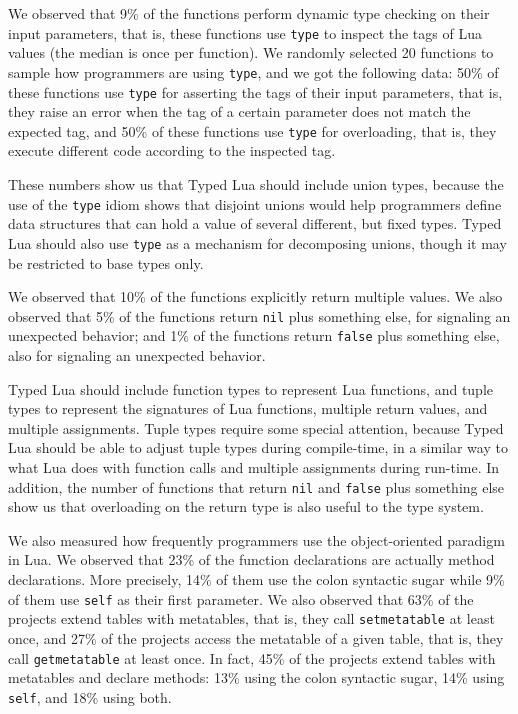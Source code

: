 We observed that 9\% of the functions perform dynamic type checking
on their input parameters, that is, these functions use \texttt{type}
to inspect the tags of Lua values (the median is once per function).
We randomly selected 20 functions to sample how programmers are
using \texttt{type}, and we got the following data:
50\% of these functions use \texttt{type} for asserting the tags of
their input parameters, that is, they raise an error when the tag of a
certain parameter does not match the expected tag, and
50\% of these functions use \texttt{type} for overloading, that is,
they execute different code according to the inspected tag.

These numbers show us that Typed Lua should include union types,
because the use of the \texttt{type} idiom shows that disjoint unions
would help programmers define data structures that can hold a value of
several different, but fixed types.
Typed Lua should also use \texttt{type} as a mechanism for decomposing
unions, though it may be restricted to base types only.

We observed that 10\% of the functions explicitly return multiple
values.
We also observed that 5\% of the functions return \texttt{nil} plus
something else, for signaling an unexpected behavior;
and 1\% of the functions return \texttt{false} plus something else,
also for signaling an unexpected behavior.

Typed Lua should include function types to represent Lua functions,
and tuple types to represent the signatures of Lua functions,
multiple return values, and multiple assignments.
Tuple types require some special attention, because Typed Lua
should be able to adjust tuple types during compile-time, in a
similar way to what Lua does with function calls and multiple
assignments during run-time.
In addition, the number of functions that return \texttt{nil} and
\texttt{false} plus something else show us that overloading on the
return type is also useful to the type system.

We also measured how frequently programmers use the object-oriented
paradigm in Lua.
We observed that 23\% of the function declarations are actually
method declarations.
More precisely, 14\% of them use the colon syntactic sugar while
9\% of them use \texttt{self} as their first parameter.
We also observed that 63\% of the projects extend tables with
metatables, that is, they call \texttt{setmetatable} at least once,
and 27\% of the projects access the metatable of a given table,
that is, they call \texttt{getmetatable} at least once.
In fact, 45\% of the projects extend tables with metatables and
declare methods:
13\% using the colon syntactic sugar, 14\% using \texttt{self}, and
18\% using both.

